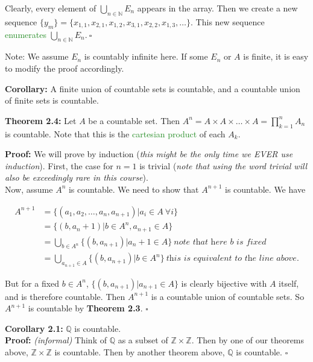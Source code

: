 \documentclass{article}
\newcommand{\Divides}{\mathbin{\big|}}
\begin{document}
Clearly, every element of $\bigcup_{n \in \mathbb{N}} E_n$ appears in the array. Then we create a new sequence $\{y_m\}=\{x_{1,1}, x_{2,1}, x_{1,2}, x_{3,1}, x_{2,2}, x_{1,3}, \dots \}$. This new sequence \textcolor{ForestGreen}{enumerates} $\bigcup_{n \in \mathbb{N}} E_n. \ \square$

Note: We assume $E_n$ is countably infinite here. If some $E_n$ or $A$ is finite, it is easy to modify the proof accordingly.

\textbf{Corollary:} A finite union of countable sets is countable, and a countable union of finite sets is countable.

\textbf{Theorem 2.4:} Let $A$ be a countable set. Then $A^n = A \times A \times \dots \times A = \prod_{k=1}^{n} A_n$ is countable. Note that this is the \textcolor{ForestGreen}{cartesian product} of each $A_k$.

\textbf{Proof:} We will prove by induction (\textit{this might be the only time we EVER use induction}). First, the case for $n=1$ is trivial (\textit{note that using the word trivial will also be exceedingly rare in this course}). \\
Now, assume $A^n$ is countable. We need to show that $A^{n+1}$ is countable. We have

\begin{align*}
    A^{n+1} &= \{(a_1,a_2, \dots,a_n,a_{n+1}) \Divides a_i \in A \ \forall i\}\\
    &=\{(b, a_n+1) \Divides b \in A^n, a_{n+1} \in A\}\\
    &= \bigcup_{b \in A^n} \{(b,a_{n+1}) \Divides a_n+1 \in A\} \ \textit{note that here $b$ is fixed}\\
    &= \bigcup_{a_{n+1} \in A} \{(b,a_{n+1}) \Divides b \in A^n\} \ \textit{this is equivalent to the line above}.
\end{align*}

But for a fixed $b \in A^n$, $\{(b,a_{n+1}) \Divides a_{n+1} \in A\}$ is clearly bijective with $A$ itself, and is therefore countable. Then $A^{n+1}$ is a countable union of countable sets. So $A^{n+1}$ is countable by \textbf{Theorem 2.3}. $\square$

\textbf{Corollary 2.1:} $\mathbb{Q}$ is countable.\\
\textbf{Proof:} \textit{(informal)} Think of $\mathbb{Q}$ as a subset of $\mathbb{Z} \times \mathbb{Z}$. Then by one of our theorems above, $\mathbb{Z} \times \mathbb{Z}$ is countable. Then by another theorem above, $\mathbb{Q}$ is countable. $\square$
\end{document}
